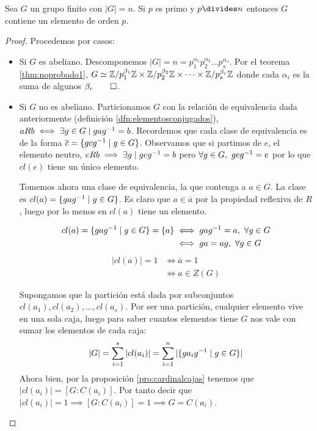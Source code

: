 \begin{thm}[de Cauchy]
	\label{thm:cauchy}
	Sea $G$ un grupo finito con $|G| = n$. Si $p$ es primo y $p\divides n$ entonces $G$ contiene un elemento de orden $p$.
\end{thm}

\begin{proof}
	Procedemos por casos:
	\begin{itemize}
		\item Si $G$ es abeliano. Descomponemos $|G| = n = p_1^{\alpha_1}p_2^{\alpha_2}\dots p_s^{\alpha_s}$. Por el teorema \ref{thm:noprobado1}, $G \simeq \mathbb{Z}/p_1^{\beta_1}\mathbb{Z} \times \mathbb{Z}/p_2^{\beta_2}\mathbb{Z} \times \dots \times \mathbb{Z}/p_s^{\beta_r}\mathbb{Z}$ donde cada $\alpha_i$ es la suma de algunos $\beta_r \qed$.
		
		\item Si $G$ no es abeliano. Particionamos $G$ con la relación de equivalencia dada anteriormente (definición \ref{dfn:elementosconjugados}), $aRb \iff \exists g \in G \mid gag^{-1} = b$. Recordemos que cada clase de equivalencia es de la forma $\overline{c} = \{gcg^{-1} \mid g \in G\}$. Observamos que si partimos de $e$, el elemento neutro, $eRb \implies \exists g \mid geg^{-1} = b$ pero $\forall g \in G,\ geg^{-1} = e$ por lo que $cl(e)$ tiene un único elemento.
		
		Tomemos ahora una clase de equivalencia, la que contenga a $a \in G$. La clase es $cl(a) = \{gag^{-1} \mid g \in G\}$. Es claro que $a \in \overline{a}$ por la propiedad reflexiva de $R$, luego por lo menos en $cl(a)$ tiene un elemento.
		
		\begin{align*}
		cl(a) = \{gag^{-1} \mid g \in G\} = \{a\} &\iff gag^{-1} = a,\ \forall g \in G \\
		&\iff ga = ag,\ \forall g \in G
		\end{align*}
		\begin{align*}
		|cl(a)| = 1 &\iff \overline{a} = 1 \\
		&\iff a \in Z(G)
		\end{align*}
		
		Supongamos que la partición está dada por subconjuntos $cl(a_1), cl(a_2), \dots, cl(a_s)$. Por ser una partición, cualquier elemento vive en una sola caja, luego para saber cuantos elementos tiene $G$ nos vale con sumar los elementos de cada caja:
		\begin{align*}
		|G| = \sum_{i = 1}^{s} |cl(a_i)| = \sum_{i = 1}^n |\{ga_ig^{-1} \mid g \in G\}|
		\end{align*}
		Ahora bien, por la proposición \ref{pro:cardinalcajas} tenemos que $|cl(a_i)| = [G:C(a_i)]$. Por tanto decir que $|cl(a_i)| = 1 \implies [G:C(a_i)] = 1 \implies G = C(a_i)$.
		

\end{itemize}
\end{proof}

